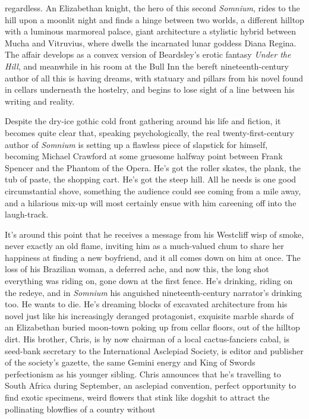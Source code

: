 \documentclass[
]{article}
\begin{document}
regardless. An Elizabethan knight, the hero of this second
\emph{Somnium}, rides to the hill upon a moonlit night and finds a hinge
between two worlds, a different hilltop with a luminous marmoreal
palace, giant architecture a stylistic hybrid between Mucha and
Vitruvius, where dwells the incarnated lunar goddess Diana Regina. The
affair develops as a convex version of Beardsley's erotic fantasy
\emph{Under the Hill}, and meanwhile in his room at the Bull Inn the
bereft nineteenth-century author of all this is having dreams, with
statuary and pillars from his novel found in cellars underneath the
hostelry, and begins to lose sight of a line between his writing and
reality. \par
Despite the dry-ice gothic cold front gathering around his life
and fiction, it becomes quite clear that, speaking psychologically, the
real twenty-first-century author of \emph{Somnium} is setting up a
flawless piece of slapstick for himself, becoming Michael Crawford at
some gruesome halfway point between Frank Spencer and the Phantom of the
Opera. He's got the roller skates, the plank, the tub of paste, the
shopping cart. He's got the steep hill. All he needs is one good
circumstantial shove, something the audience could see coming from a
mile away, and a hilarious mix-up will most certainly ensue with him
careening off into the laugh-track. \par
It's around this point that he receives a message from his
Westcliff wisp of smoke, never exactly an old flame, inviting him as a
much-valued chum to share her happiness at finding a new boyfriend, and
it all comes down on him at once. The loss of his Brazilian woman, a
deferred ache, and now this, the long shot everything was riding on,
gone down at the first fence. He's drinking, riding on the redeye, and
in \emph{Somnium} his anguished nineteenth-century narrator's drinking
too. He wants to die. He's dreaming blocks of excavated architecture
from his novel just like his increasingly deranged protagonist,
exquisite marble shards of an Elizabethan buried moon-town poking up
from cellar floors, out of the hilltop dirt. His brother, Chris, is by
now chairman of a local cactus-fanciers cabal, is seed-bank secretary to
the International Asclepiad Society, is editor and publisher of the
society's gazette, the same Gemini energy and King of Swords
perfectionism as his younger sibling. Chris announces that he's
travelling to South Africa during September, an asclepiad convention,
perfect opportunity to find exotic specimens, weird flowers that stink
like dogshit to attract the pollinating blowflies of a country without
\end{document}
